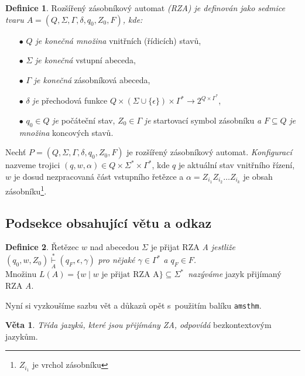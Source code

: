 \documentclass[twocolumn, 11pt]{article}
\theoremstyle{definition}
\newtheorem{definice}{Definice}
\newtheorem{veta}{Věta}
\begin{document}
\begin{definice} \label{def:1}
Rozšířený zásobníkový automat \emph{(RZA) je definován jako sedmice tvaru $A = (Q, \Sigma, \Gamma, \delta, q_0, Z_0, F)$, kde:}
\begin{itemize}
    \item[$\bullet$] \emph{$Q$ je konečná množina} vnitřních (řídicích) stavů,
    \item[$\bullet$] $\Sigma$ \emph{je konečná} vstupní abeceda,
    \item[$\bullet$] $\Gamma$ \emph{je konečná} zásobníková abeceda,
    \item[$\bullet$] $\delta$ \emph{je} přechodová funkce $Q \times(\Sigma \cup\{\epsilon\}) \times \Gamma^{*} \rightarrow 2^{Q \times \Gamma^{*}}$,
    \item[$\bullet$] $q_0 \in Q$ \emph{je} počáteční stav, $Z_0 \in \Gamma$ \emph{je} startovací symbol zásobníku \emph{a} $F \subseteq Q$ \emph{je množina} koncových stavů.
\end{itemize}

Nechť $P = (Q, \Sigma, \Gamma, \delta, q_0, Z_0, F)$ je rozšířený zásobníkový automat. 
\emph{Konfigurací} nazveme trojici $(q, w, \alpha) \in Q \times \Sigma^{*} \times \Gamma^{*} $, kde $q$ je aktuální stav vnitřního řízení, $w$ je dosud nezpracovaná část vstupního řetězce a $\alpha = Z_{i_1} Z_{i_2} \dots Z_{i_k}$ je obsah zásobníku\footnote{$Z_{i_1}$ je vrchol zásobníku}.
\end{definice}

\subsection{Podsekce obsahující větu a odkaz}
\begin{definice} \label{def:2}
Řetězec $w$ nad abecedou $\Sigma$ je přijat RZA \emph{A jestliže} $(q_0, w, Z_0) \overset{*}{\underset{A}\vdash} (q_{F}, \epsilon, \gamma)$ \emph{pro nějaké $\gamma \in \Gamma^{*}$ a $q_{F} \in F$.
$\text{Množinu } L(A) = \{w \mid w \text{ je přijat RZA A}\} \subseteq \Sigma^{*}$~nazýváme} jazyk přijímaný RZA \emph{A}.
\end{definice}

Nyní si vyzkoušíme sazbu vět a důkazů opět s~použitím balíku \verb|amsthm|.

\begin{veta} \label{vet:1}
\emph{Třída jazyků, které jsou přijímány ZA, odpovídá} bezkontextovým jazykům.
\end{veta}
\end{document}
